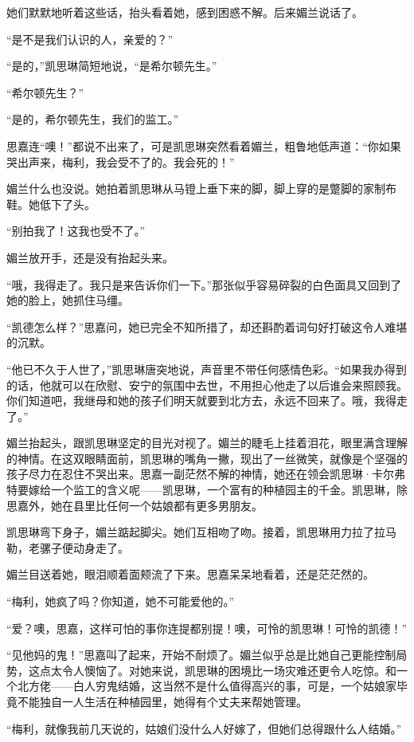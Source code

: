 \par 她们默默地听着这些话，抬头看着她，感到困惑不解。后来媚兰说话了。
\par “是不是我们认识的人，亲爱的？”
\par “是的，”凯思琳简短地说，“是希尔顿先生。”
\par “希尔顿先生？”
\par “是的，希尔顿先生，我们的监工。”
\par 思嘉连“噢！”都说不出来了，可是凯思琳突然看着媚兰，粗鲁地低声道：“你如果哭出声来，梅利，我会受不了的。我会死的！”
\par 媚兰什么也没说。她拍着凯思琳从马镫上垂下来的脚，脚上穿的是蹩脚的家制布鞋。她低下了头。
\par “别拍我了！这我也受不了。”
\par 媚兰放开手，还是没有抬起头来。
\par “哦，我得走了。我只是来告诉你们一下。”那张似乎容易碎裂的白色面具又回到了她的脸上，她抓住马缰。
\par “凯德怎么样？”思嘉问，她已完全不知所措了，却还斟酌着词句好打破这令人难堪的沉默。
\par “他已不久于人世了，”凯思琳唐突地说，声音里不带任何感情色彩。“如果我办得到的话，他就可以在欣慰、安宁的氛围中去世，不用担心他走了以后谁会来照顾我。你们知道吧，我继母和她的孩子们明天就要到北方去，永远不回来了。哦，我得走了。”
\par 媚兰抬起头，跟凯思琳坚定的目光对视了。媚兰的睫毛上挂着泪花，眼里满含理解的神情。在这双眼睛面前，凯思琳的嘴角一撇，现出了一丝微笑，就像是个坚强的孩子尽力在忍住不哭出来。思嘉一副茫然不解的神情，她还在领会凯思琳·卡尔弗特要嫁给一个监工的含义呢——凯思琳，一个富有的种植园主的千金。凯思琳，除思嘉外，她在县里比任何一个姑娘都有更多男朋友。
\par 凯思琳弯下身子，媚兰踮起脚尖。她们互相吻了吻。接着，凯思琳用力拉了拉马勒，老骡子便动身走了。
\par 媚兰目送着她，眼泪顺着面颊流了下来。思嘉呆呆地看着，还是茫茫然的。
\par “梅利，她疯了吗？你知道，她不可能爱他的。”
\par “爱？噢，思嘉，这样可怕的事你连提都别提！噢，可怜的凯思琳！可怜的凯德！”
\par “见他妈的鬼！”思嘉叫了起来，开始不耐烦了。媚兰似乎总是比她自己更能控制局势，这点太令人懊恼了。对她来说，凯思琳的困境比一场灾难还更令人吃惊。和一个北方佬——白人穷鬼结婚，这当然不是什么值得高兴的事，可是，一个姑娘家毕竟不能独自一人生活在种植园里，她得有个丈夫来帮她管理。
\par “梅利，就像我前几天说的，姑娘们没什么人好嫁了，但她们总得跟什么人结婚。”
